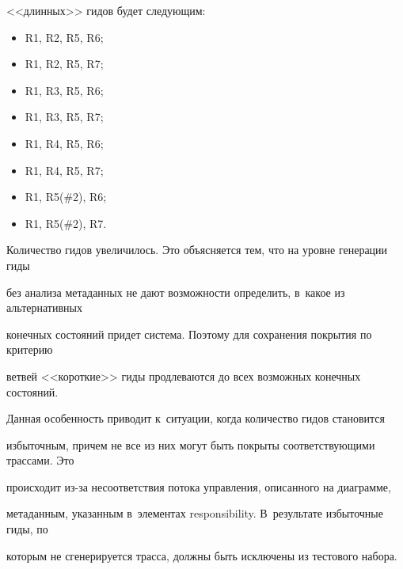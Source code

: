 <<длинных>> гидов будет следующим:


\begin{itemize}


\item    R1, R2, R5, R6;


\item


   R1, R2, R5, R7;


\item


   R1, R3, R5, R6;


\item


   R1, R3, R5, R7;


\item


   R1, R4, R5, R6;


\item


   R1, R4, R5, R7;


\item


   R1, R5(\#2), R6;


\item


   R1, R5(\#2), R7.


\end{itemize}





   Количество гидов увеличилось. Это объясняется тем, что на уровне генерации гиды


без анализа метаданных не дают возможности определить, в~какое из альтернативных


конечных состояний придет система. Поэтому для сохранения покрытия по критерию


ветвей <<короткие>> гиды продлеваются до всех возможных конечных состояний.


Данная особенность приводит к~ситуации, когда количество гидов становится


избыточным, причем не все из них могут быть покрыты соответствующими трассами. Это


происходит из-за несоответствия потока управления, описанного на диаграмме,


метаданным, указанным в~элементах responsibility. В~результате избыточные гиды, по


которым не сгенерируется трасса, должны быть исключены из тестового набора.





